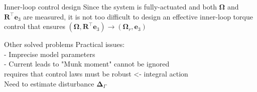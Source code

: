 \documentclass{beamer}
\begin{document}
\begin{frame}{Inner-loop control design}
	Since the system is fully-actuated and both $\mathbf{\Omega}$ and $\mathbf{R}^\top \mathbf{e}_3$ are measured, it is not too difficult to design an effective inner-loop torque control that ensures  $(\mathbf{\Omega}, \mathbf{R}^\top \mathbf{e}_3) \longrightarrow (\mathbf{\Omega}_r, \mathbf{e}_3)$
\end{frame}

\begin{frame}{Other solved problems}
Practical issues:\\
- Imprecise model parameters\\
- Current leads to "Munk moment" cannot be ignored\\
requires that control laws must be robust  <- integral action\\
Need to estimate disturbance $\mathbf{\Delta}_{\Gamma}$
 
\end{frame}
\end{document}
